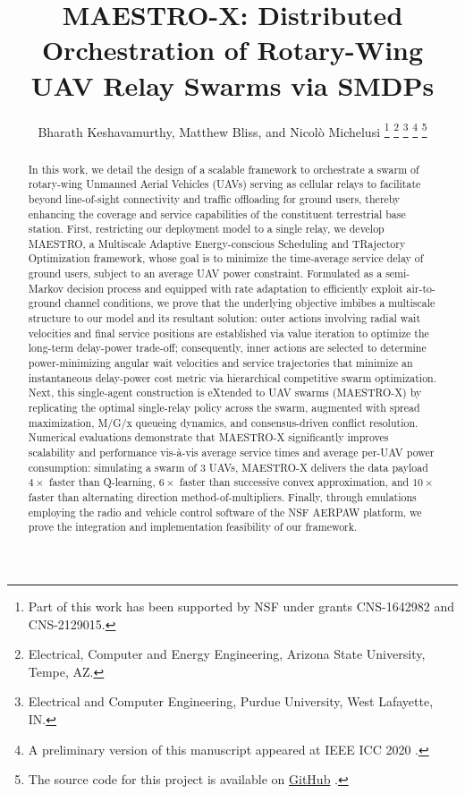 \documentclass[12pt, draftcls, onecolumn]{IEEEtran}
\title{MAESTRO-X: Distributed Orchestration of Rotary-Wing UAV Relay Swarms via SMDPs}
\author{Bharath Keshavamurthy\IEEEauthorrefmark{1}, Matthew Bliss\IEEEauthorrefmark{2}, and Nicol\`{o} Michelusi\IEEEauthorrefmark{1}
\thanks{Part of this work has been supported by NSF under grants CNS-1642982 and CNS-2129015.}
\thanks{\IEEEauthorrefmark{1}Electrical, Computer and Energy Engineering, Arizona State University, Tempe, AZ.}
\thanks{\IEEEauthorrefmark{2}Electrical and Computer Engineering, Purdue University, West Lafayette, IN.}
\thanks{A preliminary version of this manuscript appeared at IEEE ICC 2020 \cite{ICC}.}
\thanks{The source code for this project is available on \href{https://github.com/bharathkeshavamurthy/Aesir.git}{GitHub} \cite{Aesir}.}
\vspace{-6mm}
}
\theoremstyle{plain}
\theoremstyle{definition}
\theoremstyle{remark}
\begin{document}
\maketitle
\thispagestyle{plain}
\pagestyle{plain}
\vspace{-14mm}


\begin{abstract}
In this work, we detail the design of a scalable framework to orchestrate a swarm of rotary-wing Unmanned Aerial Vehicles (UAVs) serving as cellular relays to facilitate beyond line-of-sight connectivity and traffic offloading for ground users, thereby enhancing the coverage and service capabilities of the constituent terrestrial base station. First, restricting our deployment model to a single relay, we develop MAESTRO, a Multiscale Adaptive Energy-conscious Scheduling and TRajectory Optimization framework, whose goal is to minimize the time-average service delay of ground users, subject to an average UAV power constraint. Formulated as a semi-Markov decision process and equipped with rate adaptation to efficiently exploit air-to-ground channel conditions, we prove that the underlying objective imbibes a multiscale structure to our model and its resultant solution: outer actions involving radial wait velocities and final service positions are established via value iteration to optimize the long-term delay-power trade-off; consequently, inner actions are selected to determine power-minimizing angular wait velocities and service trajectories that minimize an instantaneous delay-power cost metric via hierarchical competitive swarm optimization. Next, this single-agent construction is eXtended to UAV swarms (MAESTRO-X) by replicating the optimal single-relay policy across the swarm, augmented with spread maximization, M/G/x queueing dynamics, and consensus-driven conflict resolution. Numerical evaluations demonstrate that MAESTRO-X significantly improves scalability and performance vis-à-vis average service times and average per-UAV power consumption: simulating a swarm of $3$ UAVs, MAESTRO-X delivers the data payload $4\times$ faster than Q-learning, $6\times$ faster than successive convex approximation, and $10\times$ faster than alternating direction method-of-multipliers. Finally, through emulations employing the radio and vehicle control software of the NSF AERPAW platform, we prove the integration and implementation feasibility of our framework.
\end{abstract}
\vspace{-4mm}
\end{document}
